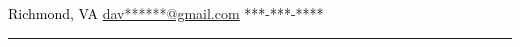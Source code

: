 \documentclass[10pt,A4]{article}
\begin{document}
\pagestyle{fancy}	

\begin{minipage}[c][0.085\textheight][t]{\linewidth}
\begin{center}
	\vspace{14pt}
	\textcolor{black}{\small{  Richmond, VA  \hspace{12pt}    \href{mailto:davidh804@gmail.com}{dav******@gmail.com}  \hspace{12pt}     ***-***-****}} \\ \hspace{22pt}
        \hspace{16pt}\textcolor{sectcol}{\rule[-1mm]{2pt}{0.9cm}}\hspace{18pt}

         
         
\end{center}
\end{minipage}\\[-4pt]

\end{document}
